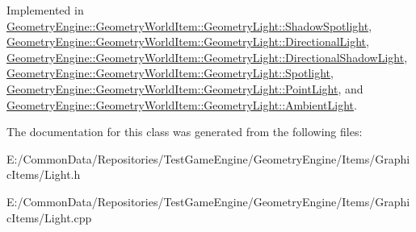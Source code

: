 Implemented in \mbox{\hyperlink{class_geometry_engine_1_1_geometry_world_item_1_1_geometry_light_1_1_shadow_spotlight_aea5bd6e9315d5df327f59d752f8c6f95}{Geometry\+Engine\+::\+Geometry\+World\+Item\+::\+Geometry\+Light\+::\+Shadow\+Spotlight}}, \mbox{\hyperlink{class_geometry_engine_1_1_geometry_world_item_1_1_geometry_light_1_1_directional_light_ae395d609ee47dd5d399514bb2c76d2db}{Geometry\+Engine\+::\+Geometry\+World\+Item\+::\+Geometry\+Light\+::\+Directional\+Light}}, \mbox{\hyperlink{class_geometry_engine_1_1_geometry_world_item_1_1_geometry_light_1_1_directional_shadow_light_a9eb42440febb19231e71555f7fde2346}{Geometry\+Engine\+::\+Geometry\+World\+Item\+::\+Geometry\+Light\+::\+Directional\+Shadow\+Light}}, \mbox{\hyperlink{class_geometry_engine_1_1_geometry_world_item_1_1_geometry_light_1_1_spotlight_a89686934756cc47dd810cc43d8f5f88a}{Geometry\+Engine\+::\+Geometry\+World\+Item\+::\+Geometry\+Light\+::\+Spotlight}}, \mbox{\hyperlink{class_geometry_engine_1_1_geometry_world_item_1_1_geometry_light_1_1_point_light_acf3ebd411b36d95ba26ae41bcc25793a}{Geometry\+Engine\+::\+Geometry\+World\+Item\+::\+Geometry\+Light\+::\+Point\+Light}}, and \mbox{\hyperlink{class_geometry_engine_1_1_geometry_world_item_1_1_geometry_light_1_1_ambient_light_a37469f72317d3d9cd0e5fb46fbf5fedf}{Geometry\+Engine\+::\+Geometry\+World\+Item\+::\+Geometry\+Light\+::\+Ambient\+Light}}.



The documentation for this class was generated from the following files\+:\begin{DoxyCompactItemize}
\item 
E\+:/\+Common\+Data/\+Repositories/\+Test\+Game\+Engine/\+Geometry\+Engine/\+Items/\+Graphic\+Items/Light.\+h\item 
E\+:/\+Common\+Data/\+Repositories/\+Test\+Game\+Engine/\+Geometry\+Engine/\+Items/\+Graphic\+Items/Light.\+cpp\end{DoxyCompactItemize}
